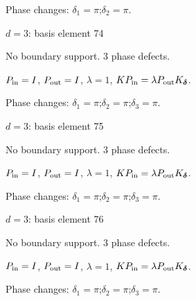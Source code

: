 \par\smallskip\begin{minipage}{.98\linewidth}\small Phase changes: $\delta_{1}=\pi$;\quad $\delta_{2}=\pi$.\end{minipage}
\vfill
{\footnotesize\texttt{}}
\newpage
{}
{\Large $d=3$: basis element 74}\par
No boundary support. 3 phase defects.
\begin{center}
\end{center}
\vspace{-1mm}
$P_{\rm in}=I$, \quad $P_{\rm out}=I$, \quad $\lambda=1$, \qquad $K P_{\rm in}=\lambda P_{\rm out}K_{\boldsymbol\delta}$.
\par\smallskip\begin{minipage}{.98\linewidth}\small Phase changes: $\delta_{1}=\pi$;\quad $\delta_{2}=\pi$;\quad $\delta_{3}=\pi$.\end{minipage}
\vfill
{\footnotesize\texttt{}}
\newpage
{}
{\Large $d=3$: basis element 75}\par
No boundary support. 3 phase defects.
\begin{center}
\end{center}
\vspace{-1mm}
$P_{\rm in}=I$, \quad $P_{\rm out}=I$, \quad $\lambda=1$, \qquad $K P_{\rm in}=\lambda P_{\rm out}K_{\boldsymbol\delta}$.
\par\smallskip\begin{minipage}{.98\linewidth}\small Phase changes: $\delta_{1}=\pi$;\quad $\delta_{2}=\pi$;\quad $\delta_{3}=\pi$.\end{minipage}
\vfill
{\footnotesize\texttt{}}
\newpage
{}
{\Large $d=3$: basis element 76}\par
No boundary support. 3 phase defects.
\begin{center}
\end{center}
\vspace{-1mm}
$P_{\rm in}=I$, \quad $P_{\rm out}=I$, \quad $\lambda=1$, \qquad $K P_{\rm in}=\lambda P_{\rm out}K_{\boldsymbol\delta}$.
\par\smallskip\begin{minipage}{.98\linewidth}\small Phase changes: $\delta_{1}=\pi$;\quad $\delta_{2}=\pi$;\quad $\delta_{3}=\pi$.\end{minipage}
